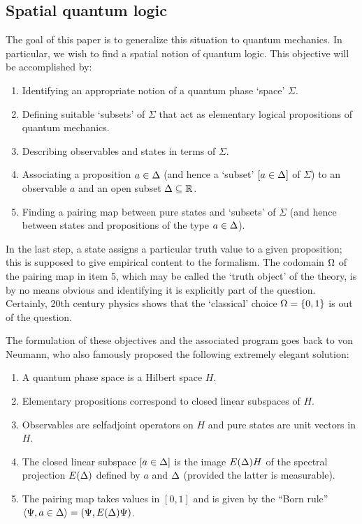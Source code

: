 \documentclass[12pt]{article}
\newcommand{\Sg}{\Sigma} \newcommand{\ta}{\tau} \newcommand{\ph}{\phi}
\begin{document}
\subsection{Spatial quantum logic}\label{subsec:SQL}
The goal of this paper is to generalize this  situation to
quantum mechanics. In particular, we wish to find a spatial notion of
quantum logic.
This objective will be accomplished by:
\begin{enumerate}
\item  Identifying an appropriate notion of a quantum phase `space' $\Sg$.
\item Defining suitable  `subsets' of $\Sg$  that act as  elementary logical propositions of quantum mechanics.
\item Describing observables and states in terms of $\Sg$.
\item Associating a proposition $a\in\Delta$ (and hence a
`subset' $[a\in\Delta]$ of $\Sg$) to an observable $a$ and an open subset $\Delta\subseteq{\mathbb R}$.
\item Finding a  pairing map between pure states and `subsets' of $\Sg$ (and hence between states and propositions of the type $a\in\Delta$).
\end{enumerate}
In the last step, a state assigns a particular truth value to a given proposition; this is supposed to  give empirical content to the formalism.
The codomain $\Omega$ of the pairing map in item 5, which may be called the `truth object' of the theory,
is by no means obvious and identifying it is explicitly part of the question.
Certainly, 20th century physics shows that
the `classical' choice $\Omega=\{0,1\}$ is out of the question.

The formulation of these objectives and the associated program goes back to
von Neumann, who also famously proposed the following extremely
elegant solution:
\begin{enumerate}
\item A quantum phase space is a Hilbert space $H$.
\item Elementary propositions correspond to closed linear subspaces of $H$.
\item Observables are selfadjoint operators on $H$ and pure states are unit vectors in $H$.
\item  The closed linear subspace $[a\in\Delta]$  is the image $E(\Delta)H$ of
the spectral projection $E(\Delta)$ defined by  $a$ and $\Delta$ (provided the latter is measurable).
\item The pairing map takes values in $[0,1]$ and is given by the ``Born rule''
 $\langle\Psi,a\in\Delta\rangle=(\Psi,E(\Delta)\Psi)$.
\end{enumerate}
\end{document}
